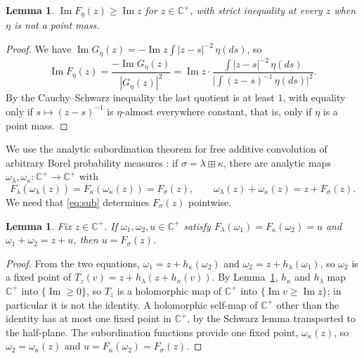 \documentclass[11pt]{amsart}
\newtheorem{lemma}[theorem]{Lemma}
\theoremstyle{definition}
\theoremstyle{remark}
\numberwithin{equation}{section}
\newcommand{\Hp}{\mathbb{C}^+}
\newcommand{\bp}{\boxplus}
\begin{document}
\begin{lemma}\label{lem:F}
$\operatorname{Im}F_\eta(z)\ge\operatorname{Im}z$ for $z\in\Hp$, with strict inequality at every $z$ when $\eta$ is not a point mass.
\end{lemma}

\begin{proof}
We have $\operatorname{Im}G_\eta(z)=-\operatorname{Im}z\int|z-s|^{-2}\,\eta(ds)$, so
\[
\operatorname{Im}F_\eta(z)=\frac{-\operatorname{Im}G_\eta(z)}{|G_\eta(z)|^2}=\operatorname{Im}z\cdot\frac{\int|z-s|^{-2}\,\eta(ds)}{\bigl|\int(z-s)^{-1}\,\eta(ds)\bigr|^2}.
\]
By the Cauchy--Schwarz inequality the last quotient is at least $1$, with equality only if $s\mapsto(z-s)^{-1}$ is $\eta$-almost everywhere constant, that is, only if $\eta$ is a point mass.
\end{proof}

We use the analytic subordination theorem for free additive convolution of arbitrary Borel probability measures \cite{Bi98,BB07,Vo93}: if $\sigma=\lambda\bp\kappa$, there are analytic maps $\omega_\lambda,\omega_\kappa\colon\Hp\to\Hp$ with
\begin{equation}\label{eq:sub}
F_\lambda(\omega_\lambda(z))=F_\kappa(\omega_\kappa(z))=F_\sigma(z),\qquad \omega_\lambda(z)+\omega_\kappa(z)=z+F_\sigma(z).
\end{equation}
We need that \eqref{eq:sub} determines $F_\sigma(z)$ pointwise.

\begin{lemma}\label{lem:unique}
Fix $z\in\Hp$. If $\omega_1,\omega_2,u\in\Hp$ satisfy $F_\lambda(\omega_1)=F_\kappa(\omega_2)=u$ and $\omega_1+\omega_2=z+u$, then $u=F_\sigma(z)$.
\end{lemma}

\begin{proof}
From the two equations, $\omega_1=z+h_\kappa(\omega_2)$ and $\omega_2=z+h_\lambda(\omega_1)$, so $\omega_2$ is a fixed point of $T_z(v)=z+h_\lambda(z+h_\kappa(v))$. By Lemma~\ref{lem:F}, $h_\kappa$ and $h_\lambda$ map $\Hp$ into $\{\operatorname{Im}\ge0\}$, so $T_z$ is a holomorphic map of $\Hp$ into $\{\operatorname{Im}v\ge\operatorname{Im}z\}$; in particular it is not the identity. A holomorphic self-map of $\Hp$ other than the identity has at most one fixed point in $\Hp$, by the Schwarz lemma transported to the half-plane. The subordination functions provide one fixed point, $\omega_\kappa(z)$, so $\omega_2=\omega_\kappa(z)$ and $u=F_\kappa(\omega_2)=F_\sigma(z)$.
\end{proof}
\end{document}
